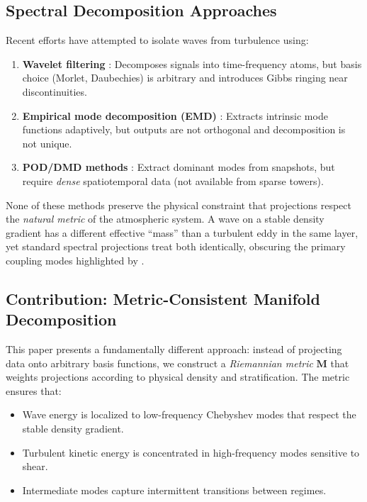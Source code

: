 \documentclass[11pt,a4paper]{article}
\begin{document}
\subsection{Spectral Decomposition Approaches}

Recent efforts have attempted to isolate waves from turbulence using:
\begin{enumerate}
  \item \textbf{Wavelet filtering} \citep{Vosper2006, Sun2015}: Decomposes signals into time-frequency atoms, but basis choice (Morlet, Daubechies) is arbitrary and introduces Gibbs ringing near discontinuities.
  \item \textbf{Empirical mode decomposition (EMD)} \citep{Huang1998}: Extracts intrinsic mode functions adaptively, but outputs are not orthogonal and decomposition is not unique.
  \item \textbf{POD/DMD methods} \citep{Schmid2010}: Extract dominant modes from snapshots, but require \emph{dense} spatiotemporal data (not available from sparse towers).
\end{enumerate}

None of these methods preserve the physical constraint that projections respect the \emph{natural metric} of the atmospheric system. A wave on a stable density gradient has a different effective ``mass'' than a turbulent eddy in the same layer, yet standard spectral projections treat both identically, obscuring the primary coupling modes highlighted by \citet{Sun2015}.

\subsection{Contribution: Metric-Consistent Manifold Decomposition}

This paper presents a fundamentally different approach: instead of projecting data onto arbitrary basis functions, we construct a \emph{Riemannian metric} $\mathbf{M}$ that weights projections according to physical density and stratification. The metric ensures that:
\begin{itemize}
  \item Wave energy is localized to low-frequency Chebyshev modes that respect the stable density gradient.
  \item Turbulent kinetic energy is concentrated in high-frequency modes sensitive to shear.
  \item Intermediate modes capture intermittent transitions between regimes.
\end{itemize}
\end{document}
